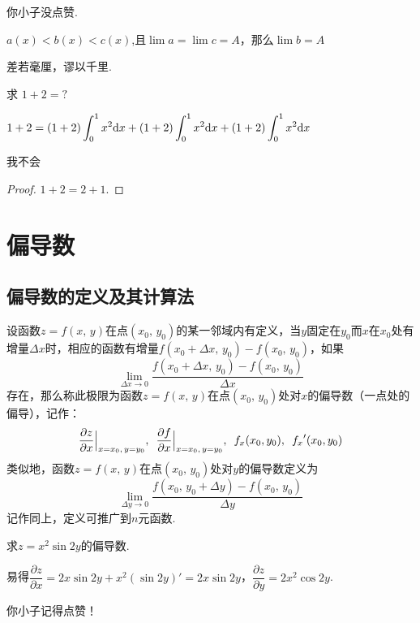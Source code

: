 \begin{corollary}[瞎编的推论]
你小子没点赞.
\end{corollary}

\begin{criterion}[夹逼准则]
$a(x) < b(x) < c(x)$,且$\lim{a} = \lim{c} = A$，那么$\lim{b} = A$
\end{criterion}

\begin{proposition}
差若毫厘，谬以千里.
\end{proposition}

\begin{example}
求 $ 1+2 = ?$
\end{example}

\begin{solution}
$\displaystyle 1 + 2 = (1+2)\int_0^1 x^2 \textup{d} x + (1+2)\int_0^1 x^2 \textup{d} x + (1+2)\int_0^1 x^2 \textup{d} x$
\end{solution}

\begin{rmk}
我不会
\end{rmk}

\begin{proof}
$1 + 2 = 2 + 1$.
\end{proof}

\section{偏导数}
\subsection{偏导数的定义及其计算法}
\begin{defn}
设函数$z=f(x,\,y)$在点$(x_0,\,y_0)$的某一邻域内有定义，当$y$固定在$y_0$而$x$在$x_0$处有增量$\Delta x$时，相应的函数有增量$f(x_0 + \Delta{x},\,y_0) - f(x_0,\,y_0)$，如果
\[
\lim_{\Delta{x} \to 0}\frac{f(x_0 + \Delta{x},\,y_0)-f(x_0,\,y_0)}{\Delta{x}}
\]
存在，那么称此极限为函数$z=f(x,\,y)$在点$(x_0,\,y_0)$处对$x$的偏导数（一点处的偏导），记作：
\[
\frac{\partial z}{\partial x}\Big| _{x=x_0,\, y=y_0} ,\enspace \frac{\partial f}{\partial x}\Big| _{x=x_0,\, y=y_0} ,\enspace f_x(x_0,y_0),\enskip {f_x}'(x_0,y_0)
\]
类似地，函数$z=f(x,\,y)$在点$(x_0,\,y_0)$处对$y$的偏导数定义为
\[
\lim_{\Delta{y} \to 0}\frac{f(x_0,\,y_0+\Delta{y})-f(x_0,\,y_0)}{\Delta{y}}
\]
记作同上，定义可推广到$n$元函数.
\end{defn}

\begin{example}
求$z = x^2\sin{2y}$的偏导数.
\end{example}
\begin{solution}
易得$\dfrac{\partial{z}}{\partial{x}} = 2x\sin{2y}+x^2(\sin{2y})' = 2x\sin{2y}$，$\dfrac{\partial{z}}{\partial{y}} = 2x^2\cos{2y}$.
\end{solution}


\begin{center}
{\LARGE 你小子记得点赞！}
\end{center}

\ifx\allfiles\undefined

\fi
